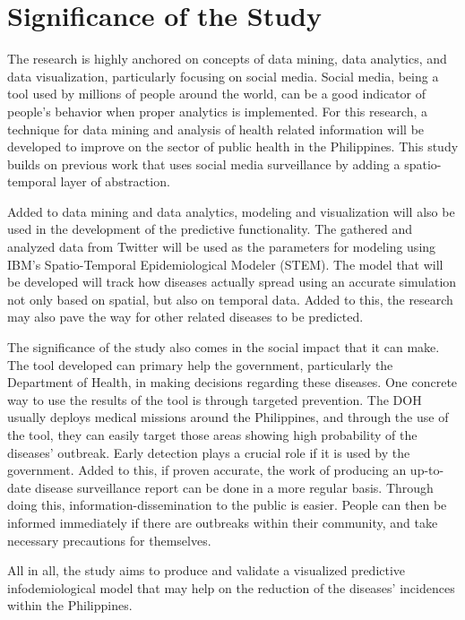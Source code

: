 \section{Significance of the Study}

The research is highly anchored on concepts of data mining, data analytics, and data visualization, particularly focusing on social media. Social media, being a tool used by millions of people around the world, can be a good indicator of people's behavior when proper analytics is implemented. For this research, a technique for data mining and analysis of health related information will be developed to improve on the sector of public health in the Philippines. This study builds on previous work that uses social media surveillance by adding a spatio-temporal layer of abstraction. 

Added to data mining and data analytics, modeling and visualization will also be used in the development of the predictive functionality. The gathered and analyzed data from Twitter will be used as the parameters for modeling using IBM's Spatio-Temporal Epidemiological Modeler (STEM). The model that will be developed will track how diseases actually spread using an accurate simulation not only based on spatial, but also on temporal data. Added to this, the research may also pave the way for other related diseases to be predicted.

The significance of the study also comes in the social impact that it can make. The tool developed can primary help the government, particularly the Department of Health, in making decisions regarding these diseases. One concrete way to use the results of the tool is through targeted prevention. The DOH usually deploys medical missions around the Philippines, and through the use of the tool, they can easily target those areas showing high probability of the diseases' outbreak. Early detection plays a crucial role if it is used by the government. Added to this, if proven accurate, the work of producing an up-to-date disease surveillance report can be done in a more regular basis. Through doing this, information-dissemination to the public is easier. People can then be informed immediately if there are outbreaks within their community, and take necessary precautions for themselves.

All in all, the study aims to produce and validate a visualized predictive infodemiological model that may help on the reduction of the diseases' incidences within the Philippines.
